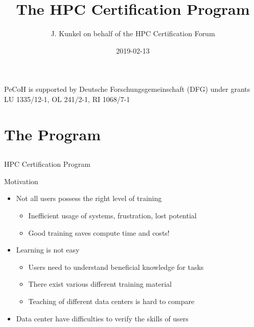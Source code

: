 \documentclass[compress,aspectratio=169]{beamer}
\subtitle{}
\title{\huge The HPC Certification Program}
\author{J. Kunkel on behalf of the HPC Certification Forum}
\date{2019-02-13}
\institute{Department of Computer Science}
\begin{document}
\begin{frame}[plain]{}
	\maketitle
	{\fontsize{5.85pt}{6pt}\selectfont PeCoH is supported by Deutsche Forschungsgemeinschaft (DFG) under grants LU 1335/12-1, OL 241/2-1, RI 1068/7-1}
\end{frame}






\section{The Program}
\sectionIntroHidden

\subsection{}

\begin{frame}{HPC Certification Program}
	\begin{block}{Motivation}
		\begin{itemize}

			\item Not all users possess the right level of training
				\begin{itemize}
				\item Inefficient usage of systems, frustration, lost potential
				\item Good training saves compute time and costs!
				\end{itemize}
			\item Learning is not easy
			\begin{itemize}
				\item Users need to understand beneficial knowledge for tasks
				\item There exist various different training material
				\item Teaching of different data centers is hard to compare
			\end{itemize}
			\item Data center have difficulties to verify the skills of users
		\end{itemize}
	\end{block}

\end{frame}
\end{document}
